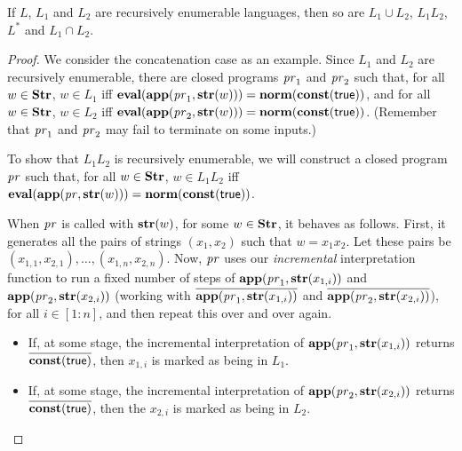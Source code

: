 %
%
%
%
%
%
%
%
\begin{theorem}
If $L$, $L_1$ and $L_2$ are recursively enumerable languages, then so
are $L_1\cup L_2$, $L_1L_2$, $L^*$ and $L_1\cap L_2$.
\end{theorem}

\begin{proof}
We consider the concatenation case as an example.  Since $L_1$ and
$L_2$ are recursively enumerable, there are closed programs $\mathit{pr}_1$ and
$\mathit{pr}_2$ such that, for all $w\in\mathbf{Str}$, $w\in L_1$ iff
$\mathbf{eval}(\mathbf{app}(\mathit{pr}_1,\mathbf{str}(w)))=\mathbf{norm}(\mathbf{const}(\mathsf{true}))$, and
for all $w\in\mathbf{Str}$, $w\in L_2$ iff
$\mathbf{eval}(\mathbf{app}(\mathit{pr}_2,\mathbf{str}(w)))=\mathbf{norm}(\mathbf{const}(\mathsf{true}))$.
(Remember that $\mathit{pr}_1$ and $\mathit{pr}_2$ may fail to terminate on some
inputs.)

To show that $L_1L_2$ is recursively enumerable, we will construct a
closed program $\mathit{pr}$ such that, for all $w\in\mathbf{Str}$, $w\in L_1L_2$ iff
$\mathbf{eval}(\mathbf{app}(\mathit{pr},\mathbf{str}(w)))=\mathbf{norm}(\mathbf{const}(\mathsf{true}))$.

When $\mathit{pr}$ is called with $\mathbf{str}(w)$, for some $w\in\mathbf{Str}$, it
behaves as follows.  First, it generates all the pairs of strings
$(x_1,x_2)$ such that $w=x_1x_2$.  Let these pairs be
$(x_{1,1},x_{2,1}),\ldots,(x_{1,n},x_{2,n})$.  Now, $\mathit{pr}$ uses our
\emph{incremental} interpretation function to run a fixed number of
steps of $\mathbf{app}(\mathit{pr}_1,\mathbf{str}(x_{1,i}))$ and
$\mathbf{app}(\mathit{pr}_2,\mathbf{str}(x_{2,i}))$ (working with
$\overline{\mathbf{app}(\mathit{pr}_1,\mathbf{str}(x_{1,i}))}$ and
$\overline{\mathbf{app}(\mathit{pr}_2,\mathbf{str}(x_{2,i}))}$), for all $i\in[1:n]$,
and then repeat this over and over again.

\begin{itemize}
\item If, at some stage, the incremental interpretation of
  $\mathbf{app}(\mathit{pr}_1,\mathbf{str}(x_{1,i}))$ returns
  $\overline{\mathbf{const}(\mathsf{true})}$, then $x_{1,i}$ is marked as being in
  $L_1$.

\item If, at some stage, the incremental interpretation of
  $\mathbf{app}(\mathit{pr}_2,\mathbf{str}(x_{2,i}))$ returns
  $\overline{\mathbf{const}(\mathsf{true})}$, then the $x_{2,i}$ is marked as
  being in $L_2$.


\end{itemize}
\end{proof}

